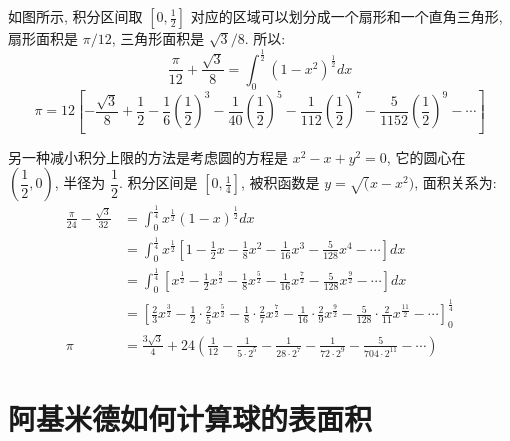 如图所示, 积分区间取 $ [0, \frac{1}{2} ] $ 对应的区域可以划分成一个扇形和一个直角三角形, 扇形面积是 $ \pi/12 $, 三角形面积是 $ \sqrt{3}/8 $. 所以:
\[
\frac{\pi}{12}+\frac{\sqrt{3}}{8} = \int_0^\frac{1}{2}{(1-x^2)^\frac{1}{2} dx} 
\]
\[
\pi = 12\left[ -\frac{\sqrt{3}}{8} + \frac{1}{2}-\frac{1}{6}(\frac{1}{2})^3-\frac{1}{40}(\frac{1}{2})^5 - \frac{1}{112}(\frac{1}{2})^7 - \frac{5}{1152}(\frac{1}{2})^9 - \cdots \right]
\]

另一种减小积分上限的方法是考虑圆的方程是 $ x^2 - x + y^2 = 0 $, 它的圆心在 $ (\dfrac{1}{2}, 0) $, 半径为 $ \dfrac{1}{2} $. 积分区间是 $ [0,\frac{1}{4} ]$, 被积函数是 $ y = \sqrt(x - x^2) $, 面积关系为:
\begin{align*}
\frac{\pi}{24} - \frac{\sqrt{3}}{32} &= \int_0^\frac{1}{4}{x^\frac{1}{2}(1-x)^\frac{1}{2} dx} \\
		&= \int_0^\frac{1}{4}{ x^\frac{1}{2}\left[ 1-\frac{1}{2}x - \frac{1}{8}x^2-\frac{1}{16}x^3-\frac{5}{128}x^4-\cdots \right] dx} \\
		&= \int_0^\frac{1}{4}{ \left[ x^\frac{1}{2}-\frac{1}{2}x^\frac{3}{2}-\frac{1}{8}x^\frac{5}{2}-\frac{1}{16}x^\frac{7}{2}-\frac{5}{128}x^\frac{9}{2}-\cdots \right] dx} \\
		&= \left[ \frac{2}{3}x^\frac{3}{2} - \frac{1}{2}\cdot\frac{2}{5}x^\frac{5}{2}-\frac{1}{8}\cdot\frac{2}{7}x^\frac{7}{2}-\frac{1}{16}\cdot\frac{2}{9}x^\frac{9}{2}-\frac{5}{128}\cdot\frac{2}{11}x^\frac{11}{2} - \cdots \right]_0^\frac{1}{4} \\
\pi &= \frac{3\sqrt{3}}{4}+24\left(\frac{1}{12}-\frac{1}{5\cdot 2^5}-\frac{1}{28\cdot 2^7} -\frac{1}{72\cdot 2^9} - \frac{5}{704\cdot 2^{11}} -\cdots \right) 
\end{align*}


\newpage
\section{阿基米德如何计算球的表面积}

